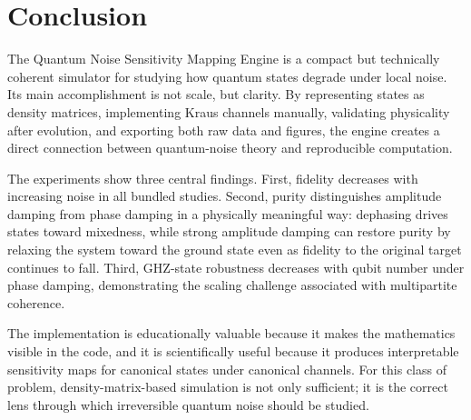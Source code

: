 \chapter{Conclusion}

The Quantum Noise Sensitivity Mapping Engine is a compact but technically coherent simulator for studying how quantum states degrade under local noise. Its main accomplishment is not scale, but clarity. By representing states as density matrices, implementing Kraus channels manually, validating physicality after evolution, and exporting both raw data and figures, the engine creates a direct connection between quantum-noise theory and reproducible computation.

The experiments show three central findings. First, fidelity decreases with increasing noise in all bundled studies. Second, purity distinguishes amplitude damping from phase damping in a physically meaningful way: dephasing drives states toward mixedness, while strong amplitude damping can restore purity by relaxing the system toward the ground state even as fidelity to the original target continues to fall. Third, GHZ-state robustness decreases with qubit number under phase damping, demonstrating the scaling challenge associated with multipartite coherence.

The implementation is educationally valuable because it makes the mathematics visible in the code, and it is scientifically useful because it produces interpretable sensitivity maps for canonical states under canonical channels. For this class of problem, density-matrix-based simulation is not only sufficient; it is the correct lens through which irreversible quantum noise should be studied.
